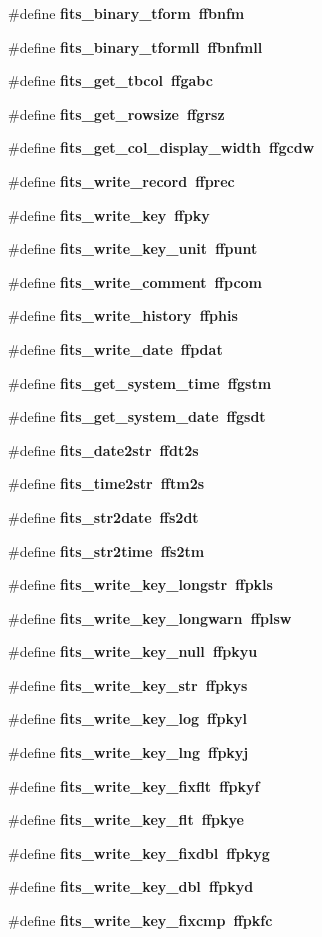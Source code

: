 \begin{CompactItemize}
\#define \bf{fits\_\-binary\_\-tform}~ffbnfm
\item 
\#define \bf{fits\_\-binary\_\-tformll}~ffbnfmll
\item 
\#define \bf{fits\_\-get\_\-tbcol}~ffgabc
\item 
\#define \bf{fits\_\-get\_\-rowsize}~ffgrsz
\item 
\#define \bf{fits\_\-get\_\-col\_\-display\_\-width}~ffgcdw
\item 
\#define \bf{fits\_\-write\_\-record}~ffprec
\item 
\#define \bf{fits\_\-write\_\-key}~ffpky
\item 
\#define \bf{fits\_\-write\_\-key\_\-unit}~ffpunt
\item 
\#define \bf{fits\_\-write\_\-comment}~ffpcom
\item 
\#define \bf{fits\_\-write\_\-history}~ffphis
\item 
\#define \bf{fits\_\-write\_\-date}~ffpdat
\item 
\#define \bf{fits\_\-get\_\-system\_\-time}~ffgstm
\item 
\#define \bf{fits\_\-get\_\-system\_\-date}~ffgsdt
\item 
\#define \bf{fits\_\-date2str}~ffdt2s
\item 
\#define \bf{fits\_\-time2str}~fftm2s
\item 
\#define \bf{fits\_\-str2date}~ffs2dt
\item 
\#define \bf{fits\_\-str2time}~ffs2tm
\item 
\#define \bf{fits\_\-write\_\-key\_\-longstr}~ffpkls
\item 
\#define \bf{fits\_\-write\_\-key\_\-longwarn}~ffplsw
\item 
\#define \bf{fits\_\-write\_\-key\_\-null}~ffpkyu
\item 
\#define \bf{fits\_\-write\_\-key\_\-str}~ffpkys
\item 
\#define \bf{fits\_\-write\_\-key\_\-log}~ffpkyl
\item 
\#define \bf{fits\_\-write\_\-key\_\-lng}~ffpkyj
\item 
\#define \bf{fits\_\-write\_\-key\_\-fixflt}~ffpkyf
\item 
\#define \bf{fits\_\-write\_\-key\_\-flt}~ffpkye
\item 
\#define \bf{fits\_\-write\_\-key\_\-fixdbl}~ffpkyg
\item 
\#define \bf{fits\_\-write\_\-key\_\-dbl}~ffpkyd
\item 
\#define \bf{fits\_\-write\_\-key\_\-fixcmp}~ffpkfc
\item 

\end{CompactItemize}
